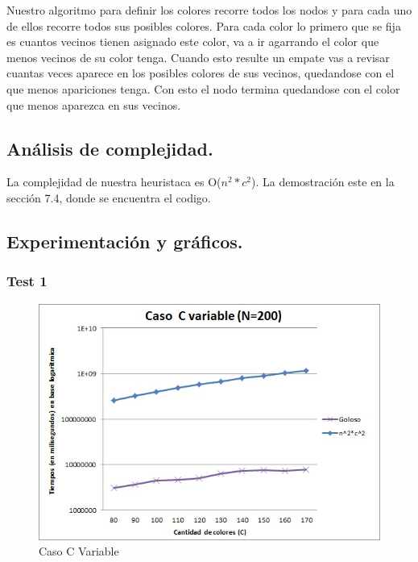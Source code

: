 Nuestro algoritmo para definir los colores recorre todos los nodos y para cada uno de ellos recorre todos sus posibles colores.
Para cada color lo primero que se fija es cuantos vecinos tienen asignado este color, va a ir agarrando el color que menos vecinos de su color tenga. Cuando esto resulte un empate vas a revisar cuantas veces aparece en los posibles colores de sus vecinos, quedandose con el que menos apariciones tenga. Con esto el nodo termina quedandose con el color que menos aparezca en sus vecinos.



\newpage
\subsection{Análisis de complejidad.}

\vspace*{0.3cm}

La complejidad de nuestra heuristaca es O($n^{2}*c^{2}$). La demostración este en la sección 7.4, donde se encuentra el codigo.


\subsection{Experimentación y gráficos.}

\vspace*{0.3cm}

\subsubsection{Test 1}

\vspace*{0.3cm}

\begin{figure}[H]
  \begin{center}
      \includegraphics[scale=0.75]{../Ejercicio3CVariable.jpg}
  \end{center}
  \caption{Caso C Variable}
\end{figure}

